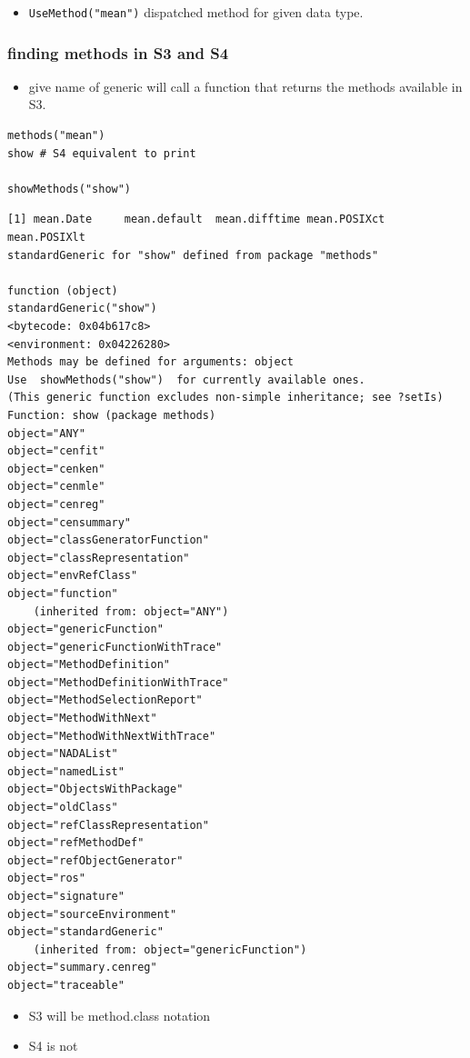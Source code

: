 \documentclass[11pt]{article}
\begin{document}
\begin{itemize}
\item \texttt{UseMethod("mean")} dispatched method for given data type.
\end{itemize}
 
\subsubsection{finding methods in S3 and S4}
\label{sec-4-3-5}

\begin{itemize}
\item give name of generic will call a function that returns the methods
  available in S3.
\end{itemize}

\begin{verbatim}
methods("mean")
show # S4 equivalent to print

showMethods("show")
\end{verbatim}


\begin{verbatim}
[1] mean.Date     mean.default  mean.difftime mean.POSIXct  mean.POSIXlt
standardGeneric for "show" defined from package "methods"

function (object) 
standardGeneric("show")
<bytecode: 0x04b617c8>
<environment: 0x04226280>
Methods may be defined for arguments: object
Use  showMethods("show")  for currently available ones.
(This generic function excludes non-simple inheritance; see ?setIs)
Function: show (package methods)
object="ANY"
object="cenfit"
object="cenken"
object="cenmle"
object="cenreg"
object="censummary"
object="classGeneratorFunction"
object="classRepresentation"
object="envRefClass"
object="function"
    (inherited from: object="ANY")
object="genericFunction"
object="genericFunctionWithTrace"
object="MethodDefinition"
object="MethodDefinitionWithTrace"
object="MethodSelectionReport"
object="MethodWithNext"
object="MethodWithNextWithTrace"
object="NADAList"
object="namedList"
object="ObjectsWithPackage"
object="oldClass"
object="refClassRepresentation"
object="refMethodDef"
object="refObjectGenerator"
object="ros"
object="signature"
object="sourceEnvironment"
object="standardGeneric"
    (inherited from: object="genericFunction")
object="summary.cenreg"
object="traceable"
\end{verbatim}

\begin{itemize}
\item S3 will be method.class notation
\item S4 is not
\end{itemize}
\end{document}
